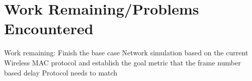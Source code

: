 \documentclass{sigcomm-alternate}
\begin{document}
\section{Work Remaining/Problems Encountered}
{
Work remaining: Finish the base case Network simulation based on the current Wireless MAC protocol and establish the goal metric that the frame number based delay Protocol needs to match 












































































































}



\balancecolumns
\end{document}
